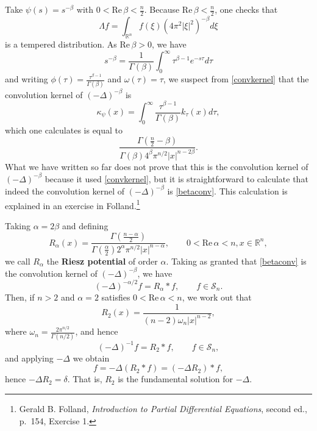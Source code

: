 \documentclass{article}
\def\Re{\ensuremath{\mathrm{Re}}\,}
\begin{document}
Take $\psi(s)=s^{-\beta}$ with $0<\Re \beta < \frac{n}{2}$. Because $\Re \beta < \frac{n}{2}$, one checks  that
\[
\Lambda f = \int_{\mathbb{R}^n} f(\xi) (4\pi^2 |\xi|^2)^{-\beta} d\xi
\]
 is a tempered distribution. As $\Re \beta>0$, we have
 \[
 s^{-\beta} = \frac{1}{\Gamma(\beta)} \int_0^\infty \tau^{\beta-1} e^{-s\tau} d\tau
 \]
 and writing $\phi(\tau)=\frac{\tau^{\beta-1}}{\Gamma(\beta)}$ and $\omega(\tau)=\tau$,
we suspect from \eqref{convkernel} that  the convolution kernel of $(-\Delta)^{-\beta}$ is
\[
\kappa_\psi(x) = \int_0^\infty \frac{\tau^{\beta-1}}{\Gamma(\beta)} k_\tau(x) d\tau,
\]
which one calculates is equal to
\begin{equation}
\frac{\Gamma\left(\frac{n}{2}-\beta\right)}{\Gamma(\beta) 4^\beta \pi^{n/2} |x|^{n-2\beta}}.
\label{betaconv}
\end{equation}
What we have written so far does not prove that this is the convolution kernel of $(-\Delta)^{-\beta}$ because it used \eqref{convkernel}, 
but it is straightforward to calculate that indeed the convolution kernel of $(-\Delta)^{-\beta}$ is \eqref{betaconv}. This calculation is explained in an exercise
in Folland.\footnote{Gerald B. Folland, {\em Introduction to Partial Differential Equations}, second ed., p.~154,
Exercise 1.}

Taking $\alpha=2\beta$ and defining
\[
R_\alpha(x) = \frac{\Gamma\left(\frac{n-\alpha}{2}\right)}{\Gamma\left(\frac{\alpha}{2}\right) 2^\alpha \pi^{n/2} |x|^{n-\alpha}},
\qquad 0<\Re \alpha<n, x \in \mathbb{R}^n,
\]
we call $R_\alpha$ the \textbf{Riesz potential} of order $\alpha$. Taking as granted that \eqref{betaconv}
is the convolution kernel of $(-\Delta)^{-\beta}$,  we have
\[
(-\Delta)^{-\alpha/2} f = R_\alpha * f, \qquad f \in \mathscr{S}_n.
\]
Then, if $n>2$ and $\alpha=2$ satisfies $0<\Re \alpha<n$, 
we work out that
\[
R_2(x)=\frac{1}{(n-2)\omega_n|x|^{n-2}},
\]
where $\omega_n=\frac{2\pi^{n/2}}{\Gamma(n/2)}$, and hence
\[
(-\Delta)^{-1} f = R_2 * f, \qquad f \in \mathscr{S}_n,
\]
and applying $-\Delta$ we obtain
\[
f = -\Delta ( R_2 * f) = (-\Delta R_2)*f,
\]
hence $-\Delta R_2 = \delta$. That is, $R_2$ is the fundamental solution for $-\Delta$.
\end{document}
